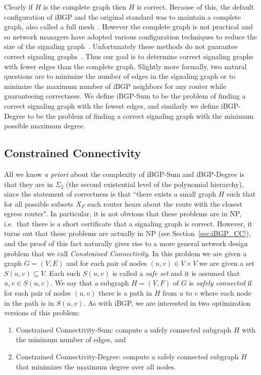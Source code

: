 \documentclass[11pt,letterpaper]{article}
\theoremstyle{definition}
\begin{document}
Clearly if $H$ is the complete graph then $H$ is correct.  Because of this, the default configuration of iBGP and the original standard was to maintain a complete graph, also called a full mesh~\cite{stewart:99}.
However the complete graph is not practical and so network managers have
adopted various configuration techniques to reduce the size of the signaling
graph~\cite{rfc:2796,rfc:3065}.
Unfortunately these methods do not guarantee correct signaling
graphs~\cite{basu,griffinwilfong:2002a}.
Thus our goal is to determine correct signaling graphs with fewer
edges than the complete graph.  Slightly more formally, two natural questions are to minimize the number of edges in the signaling
graph or to minimize the maximum number of iBGP neighbors for any router
while guaranteeing correctness.
We define {\sc iBGP-Sum} to be the problem of finding
a correct signaling graph with the fewest edges, and similarly we define {\sc iBGP-Degree} to be the problem of finding
a correct signaling graph with the minimum possible maximum degree.

\subsection{Constrained Connectivity}
All we know \emph{a priori} about the complexity of {\sc iBGP-Sum} and {\sc iBGP-Degree} is that they are in $\Sigma_2$ (the second existential level of the polynomial hierarchy), since the statement of correctness is that ``there exists a small graph $H$ such that for all possible subsets  $X_F$ each router hears about the route with the closest egress router".  In particular, it is not obvious that these problems are in NP, i.e.~that there is a short certificate that a signaling graph is correct.  However, it turns out that these problems are actually in NP (see Section~\ref{sec:iBGP_CC}), and the proof of this fact naturally gives rise to a more general network design problem that we call \emph{Constrained Connectivity}.  In this problem we are given a graph $G=(V,E)$ and for each pair of nodes $(u,v)\in V\times V$ we are given a set $S(u,v)\subseteq V$.
Each such $S(u,v)$ is called a {\em safe set} and it is assumed that
$u,v \in S(u,v)$.  We say that a subgraph $H=(V,F)$
of $G$ is {\em safely connected} if for each pair of nodes $(u,v)$ there
is a path in $H$ from $u$ to $v$ where each node in the path is in $S(u,v)$.  As with iBGP, we are interested in two optimization versions of this problem:
\begin{enumerate}
\item {\sc Constrained Connectivity-Sum}: compute a safely
connected subgraph $H$ with the minimum number of edges, and
\item {\sc Constrained Connectivity-Degree}: compute a safely
connected subgraph $H$ that minimizes the maximum degree over all nodes.
\end{enumerate}
\end{document}
